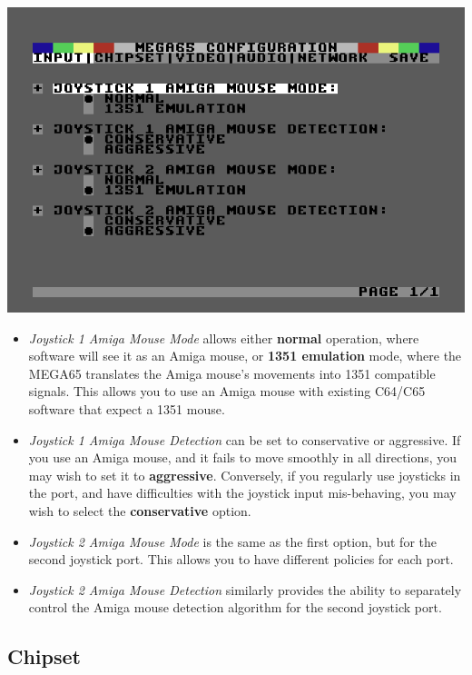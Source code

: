 \includegraphics[width=\linewidth]{images/ss-m65config-1.png}

\begin{itemize}
  \item{\em Joystick 1 Amiga Mouse Mode} allows either {\bf normal} operation,
    where software will see it as an Amiga mouse, or {\bf 1351
      emulation} mode, where the MEGA65 translates the Amiga mouse's
    movements into 1351 compatible signals. This allows you to use an
    Amiga mouse with existing C64/C65 software that expect a 1351
    mouse.
  \item{\em Joystick 1 Amiga Mouse Detection} can be set to conservative
    or aggressive.  If you use an Amiga mouse, and it fails to move
    smoothly in all directions, you may wish to set it to {\bf
      aggressive}. Conversely, if you regularly use joysticks in the
    port, and have difficulties with the joystick input
    mis-behaving, you may wish to select the {\bf conservative}
    option.
  \item{\em Joystick 2 Amiga Mouse Mode} is the same as the first
    option, but for the second joystick port. This allows you to
    have different policies for each port.
  \item{\em Joystick 2 Amiga Mouse Detection} similarly provides the
    ability to separately control the Amiga mouse detection
    algorithm for the second joystick port.
\end{itemize}


\subsection{Chipset}

